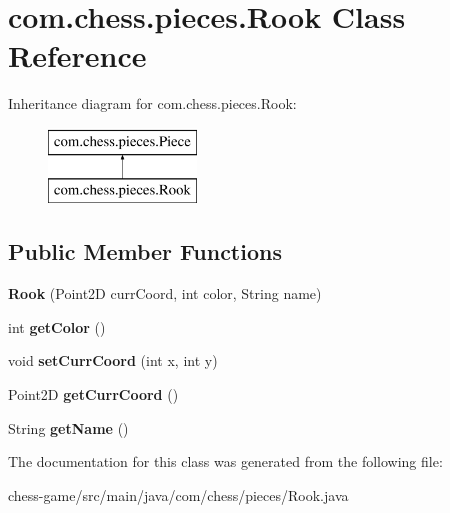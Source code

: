 \hypertarget{classcom_1_1chess_1_1pieces_1_1_rook}{}\section{com.\+chess.\+pieces.\+Rook Class Reference}
\label{classcom_1_1chess_1_1pieces_1_1_rook}
Inheritance diagram for com.\+chess.\+pieces.\+Rook\+:\begin{figure}[H]
\begin{center}
\leavevmode
\includegraphics[height=2.000000cm]{classcom_1_1chess_1_1pieces_1_1_rook}
\end{center}
\end{figure}
\subsection*{Public Member Functions}
\begin{DoxyCompactItemize}
\item 
\mbox{\label{classcom_1_1chess_1_1pieces_1_1_rook_af11e37ad8535fd042da107bd9bd39d41}} 
{\bfseries Rook} (Point2D curr\+Coord, int color, String name)
\item 
\mbox{\label{classcom_1_1chess_1_1pieces_1_1_rook_a728755210bf1faf0f9f89056db4a4306}} 
int {\bfseries get\+Color} ()
\item 
\mbox{\label{classcom_1_1chess_1_1pieces_1_1_rook_a6651140f3b3267dc81592ffdba6fc3c3}} 
void {\bfseries set\+Curr\+Coord} (int x, int y)
\item 
\mbox{\label{classcom_1_1chess_1_1pieces_1_1_rook_adde328b14cc545f4020f6e7e583d6963}} 
Point2D {\bfseries get\+Curr\+Coord} ()
\item 
\mbox{\label{classcom_1_1chess_1_1pieces_1_1_rook_ab2eb31f4a046773d15bdfb1c4ec5bd9b}} 
String {\bfseries get\+Name} ()
\end{DoxyCompactItemize}


The documentation for this class was generated from the following file\+:\begin{DoxyCompactItemize}
\item 
chess-\/game/src/main/java/com/chess/pieces/Rook.\+java\end{DoxyCompactItemize}
